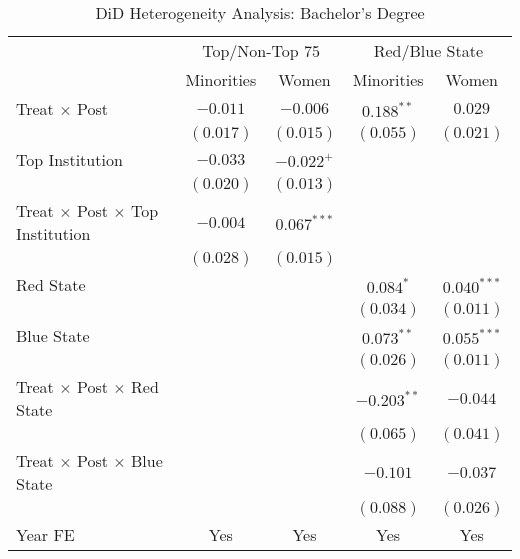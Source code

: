 \begin{table}
\caption{DiD Heterogeneity Analysis: Bachelor's Degree}
\begin{center}
\begin{tabular}{l c c c c}
\toprule
 & \multicolumn{2}{c}{Top/Non-Top 75} & \multicolumn{2}{c}{Red/Blue State} \\
\cmidrule(lr){2-3} \cmidrule(lr){4-5}
 & Minorities & Women & Minorities & Women \\
\midrule
Treat $\times$ Post                          & $-0.011$  & $-0.006$      & $0.188^{**}$  & $0.029$       \\
                                             & $(0.017)$ & $(0.015)$     & $(0.055)$     & $(0.021)$     \\
Top Institution                              & $-0.033$  & $-0.022^{+}$  &               &               \\
                                             & $(0.020)$ & $(0.013)$     &               &               \\
Treat $\times$ Post $\times$ Top Institution & $-0.004$  & $0.067^{***}$ &               &               \\
                                             & $(0.028)$ & $(0.015)$     &               &               \\
Red State                                    &           &               & $0.084^{*}$   & $0.040^{***}$ \\
                                             &           &               & $(0.034)$     & $(0.011)$     \\
Blue State                                   &           &               & $0.073^{**}$  & $0.055^{***}$ \\
                                             &           &               & $(0.026)$     & $(0.011)$     \\
Treat $\times$ Post $\times$ Red State       &           &               & $-0.203^{**}$ & $-0.044$      \\
                                             &           &               & $(0.065)$     & $(0.041)$     \\
Treat $\times$ Post $\times$ Blue State      &           &               & $-0.101$      & $-0.037$      \\
                                             &           &               & $(0.088)$     & $(0.026)$     \\
\midrule
Year FE                                      & Yes       & Yes           & Yes           & Yes           \\

\end{tabular}
\end{center}
\end{table}
